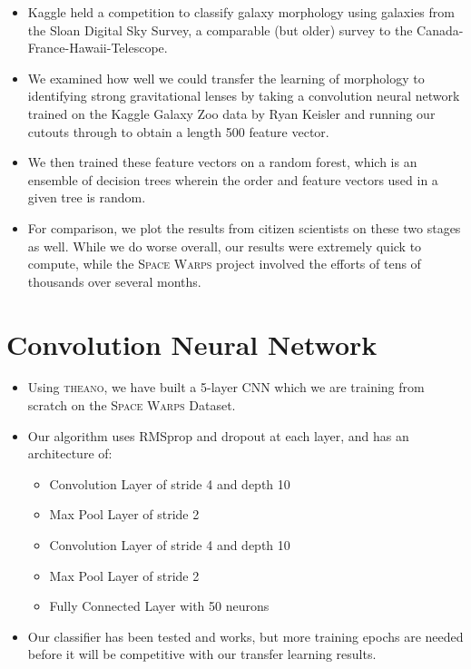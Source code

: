 \documentclass{ucbposter}
\begin{document}
\begin{itemize}
  \item{Kaggle held a competition to classify galaxy morphology using galaxies
    from the Sloan Digital Sky Survey, a comparable (but older) survey to the
  Canada-France-Hawaii-Telescope.}
  \item{We examined how well we could transfer the learning of morphology to
    identifying strong gravitational lenses by taking a convolution neural
  network trained on the Kaggle Galaxy Zoo data by Ryan Keisler and running our cutouts through
to obtain a length 500 feature vector.}
  \item{We then trained these feature vectors on a random forest, which is an
    ensemble of decision trees wherein the order and feature vectors
  used in a given tree is random.}
\item{For comparison, we plot the results from citizen scientists on these two
  stages as well. While we do worse overall, our results were extremely quick
 to compute, while the \textsc{Space Warps} project involved the
efforts of tens of thousands over several months.}
\end{itemize}


\section{Convolution Neural Network}
\begin{itemize}
  \item{Using \textsc{theano}, we have built a 5-layer CNN which we are
    training from scratch on the \textsc{Space Warps} Dataset.}
\item{Our algorithm uses RMSprop and dropout at each layer, and has an
  architecture of:}
\begin{itemize}
\item{Convolution Layer of stride 4 and depth 10}
\item{Max Pool Layer of stride 2}
\item{Convolution Layer of stride 4 and depth 10}
\item{Max Pool Layer of stride 2}
\item{Fully Connected Layer with 50 neurons}
\end{itemize}
\item{Our classifier has been tested and works, but more training epochs are
  needed before it will be competitive with our transfer learning results.}
\end{itemize}
\end{document}

